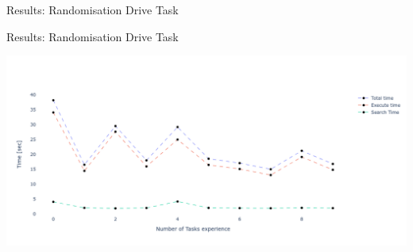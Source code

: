 \begin{frame}[fragile]{Results: Randomisation Drive Task} %
\begin{figure}
  \centering
  \quad
\end{figure}
\vspace{-0.7cm}
\begin{figure}
  \centering
  \quad
\end{figure}
\end{frame}

\begin{frame}[fragile]{Results: Randomisation Drive Task} %
\begin{center}
\includegraphics[width=1.0\textwidth]{figures/results/random_drive_execution_times}
\end{center}
\end{frame}

